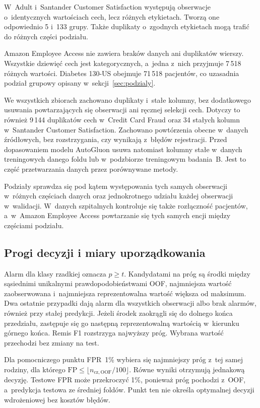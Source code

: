 W~Adult i~Santander Customer Satisfaction występują obserwacje o~identycznych wartościach cech, lecz różnych etykietach. Tworzą one odpowiednio 5 i~133 grupy. Także duplikaty o~zgodnych etykietach mogą trafić do różnych części podziału.

Amazon Employee Access nie zawiera braków danych ani duplikatów wierszy. Wszystkie dziewięć cech jest kategorycznych, a~jedna z~nich przyjmuje 7\,518 różnych wartości. Diabetes 130-US obejmuje 71\,518 pacjentów, co uzasadnia podział grupowy opisany w~sekcji~\ref{sec:podzialy}.

We wszystkich zbiorach zachowano duplikaty i~stałe kolumny, bez dodatkowego usuwania powtarzających się obserwacji ani ręcznej selekcji cech. Dotyczy to również 9\,144 duplikatów cech w~Credit Card Fraud oraz 34 stałych kolumn w~Santander Customer Satisfaction. Zachowano powtórzenia obecne w~danych źródłowych, bez rozstrzygania, czy wynikają z~błędów rejestracji. Przed dopasowaniem modelu AutoGluon usuwa natomiast kolumny stałe w~danych treningowych danego foldu lub w~podzbiorze treningowym badania~B. Jest to część przetwarzania danych przez porównywane metody.

Podziały sprawdza się pod kątem występowania tych samych obserwacji w~różnych częściach danych oraz jednokrotnego udziału każdej obserwacji w~walidacji. W~danych szpitalnych kontroluje się także rozłączność pacjentów, a~w~Amazon Employee Access powtarzanie się tych samych encji między częściami podziału.

\subsection*{Progi decyzji i miary uporządkowania}
\label{app:progi}

Alarm dla klasy rzadkiej oznacza $p\geq t$. Kandydatami na próg są środki między sąsiednimi unikalnymi prawdopodobieństwami OOF, najmniejsza wartość zaobserwowana i~najmniejsza reprezentowalna wartość większa od maksimum. Dwa ostatnie przypadki dają alarm dla wszystkich obserwacji albo brak alarmów, również przy stałej predykcji. Jeżeli środek zaokrągli się do dolnego końca przedziału, zastępuje się go następną reprezentowalną wartością w~kierunku górnego końca. Remis F1 rozstrzyga najwyższy próg. Wybrana wartość przechodzi bez zmiany na test.

Dla pomocniczego punktu FPR~1\% wybiera się najmniejszy próg z~tej samej rodziny, dla którego $\mathrm{FP}\leq\lfloor n_{\mathrm{cz,OOF}}/100\rfloor$. Równe wyniki otrzymują jednakową decyzję. Testowe FPR może przekroczyć 1\%, ponieważ próg pochodzi z~OOF, a~predykcja testowa ze średniej foldów. Punkt ten nie określa optymalnej decyzji wdrożeniowej bez kosztów błędów.

